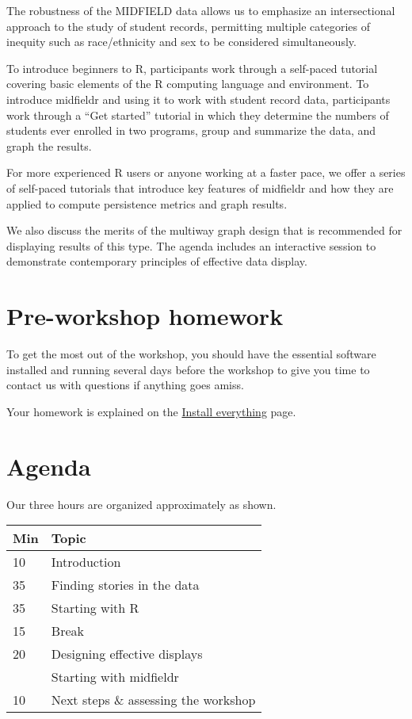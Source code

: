 \documentclass[
]{book}
\begin{document}
The robustness of the MIDFIELD data allows us to emphasize an intersectional approach to the study of student records, permitting multiple categories of inequity such as race/ethnicity and sex to be considered simultaneously.

To introduce beginners to R, participants work through a self-paced tutorial covering basic elements of the R computing language and environment. To introduce midfieldr and using it to work with student record data, participants work through a ``Get started'' tutorial in which they determine the numbers of students ever enrolled in two programs, group and summarize the data, and graph the results.

For more experienced R users or anyone working at a faster pace, we offer a series of self-paced tutorials that introduce key features of midfieldr and how they are applied to compute persistence metrics and graph results.

We also discuss the merits of the multiway graph design that is recommended for displaying results of this type. The agenda includes an interactive session to demonstrate contemporary principles of effective data display.

\hypertarget{pre-workshop-homework}{%
\section*{Pre-workshop homework}\label{pre-workshop-homework}}

To get the most out of the workshop, you should have the essential software installed and running several days before the workshop to give you time to contact us with questions if anything goes amiss.

Your homework is explained on the \protect\hyperlink{install-everything}{Install everything} page.

\hypertarget{agenda}{%
\section*{Agenda}\label{agenda}}

Our three hours are organized approximately as shown.

\begin{tabular}{ll}
\toprule
Min & Topic\\
\midrule
10 & Introduction\\
35 & Finding stories in the data\\
35 & Starting with R\\
15 & Break\\
20 & Designing effective displays\\
\addlinespace
55 & Starting with midfieldr\\
10 & Next steps \& assessing the workshop\\
\bottomrule
\end{tabular}
\end{document}
